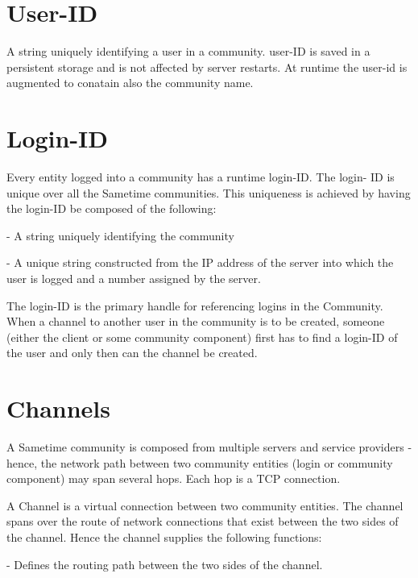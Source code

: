 \documentclass[titlepage,oneside]{book}
\begin{document}
\section{User-ID}

\par{} A string uniquely identifying a user in a community. user-ID is
saved in a persistent storage and is not affected by server
restarts. At runtime the user-id is augmented to conatain also the
community name.

\section{Login-ID}

\par{} Every entity logged into a community has a runtime
login-ID. The login- ID is unique over all the Sametime
communities. This uniqueness is achieved by having the login-ID be
composed of the following:

\par{} - A string uniquely identifying the community

\par{} - A unique string constructed from the IP address of the server
into which the user is logged and a number assigned by the server.

\par{} The login-ID is the primary handle for referencing logins in
the Community. When a channel to another user in the community is to
be created, someone (either the client or some community component)
first has to find a login-ID of the user and only then can the channel
be created.

\section{Channels}

\par{} A Sametime community is composed from multiple servers and
service providers - hence, the network path between two community
entities (login or community component) may span several hops. Each
hop is a TCP connection.

\par{} A Channel is a virtual connection between two community
entities. The channel spans over the route of network connections that
exist between the two sides of the channel. Hence the channel supplies
the following functions:

\par{} - Defines the routing path between the two sides of the
channel.
\end{document}
